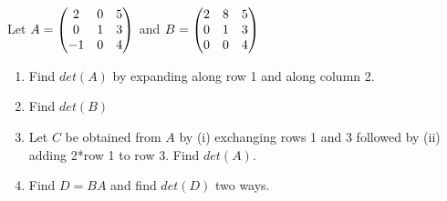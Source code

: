 \documentclass[11pt,fleqn]{article}
\begin{document}
  Let $A=\begin{pmatrix} 2&0&5\\ 0&1&3\\-1&0&4 \end{pmatrix}$ and $B=\begin{pmatrix} 2&8&5\\ 0&1&3\\0&0&4 \end{pmatrix}$ 
  \begin{enumerate}
  \item Find $det(A)$ by expanding along row 1 and along column 2.\\
  \vfill
  \item Find $det(B)$\\
  \vfill
  \item Let $C$ be obtained from $A$ by (i) exchanging rows 1 and 3 followed by (ii) adding 2*row 1 to row 3. Find $det(A)$.\\
  \vfill 
  \item Find $D=BA$ and find $det(D)$ two ways.\\
  \vfill
  \end{enumerate}
  
\end{document}
